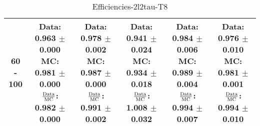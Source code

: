 \documentclass[final,letterpaper,twoside,12pt]{article}
\begin{document}
\begin{table}[htbp]
\begin{adjustwidth}{-4em}{-4em}
\begin{tabular}{|c|c|c|c|c|c|}
60 - 100 & \parbox[c]{1.1 in}{ \scriptsize  Data: 0.963 $\pm$ 0.000 \newline MC: 0.981 $\pm$ 0.000 \newline $\frac{\rm{Data}}{\rm{MC}}$: 0.982 $\pm$ 0.000} & \parbox[c]{1.1 in}{ \scriptsize  Data: 0.978 $\pm$ 0.002 \newline MC: 0.987 $\pm$ 0.000 \newline $\frac{\rm{Data}}{\rm{MC}}$: 0.991 $\pm$ 0.002} & \parbox[c]{1.1 in}{ \scriptsize  Data: 0.941 $\pm$ 0.024 \newline MC: 0.934 $\pm$ 0.018 \newline $\frac{\rm{Data}}{\rm{MC}}$: 1.008 $\pm$ 0.032} & \parbox[c]{1.1 in}{ \scriptsize  Data: 0.984 $\pm$ 0.006 \newline MC: 0.989 $\pm$ 0.004 \newline $\frac{\rm{Data}}{\rm{MC}}$: 0.994 $\pm$ 0.007} & \parbox[c]{1.1 in}{ \scriptsize  Data: 0.976 $\pm$ 0.010 \newline MC: 0.981 $\pm$ 0.001 \newline $\frac{\rm{Data}}{\rm{MC}}$: 0.994 $\pm$ 0.010}\\ \hline 
\end{tabular}
\caption {Efficiencies-2l2tau-T8}
\label{tab:cqdata0}
\end{adjustwidth}\end{table}
\end{document}
